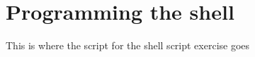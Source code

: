 \chapter{Programming the shell}

\begin{note}
  This is where the script for the shell script exercise goes

\end{note}

